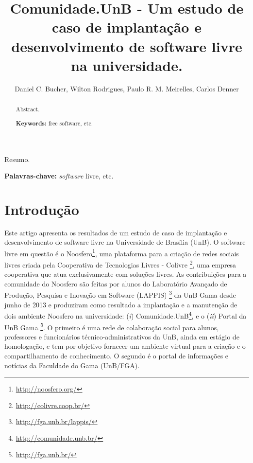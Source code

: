 \documentclass[12pt]{article}
\begin{document}
\sloppy

\title{Comunidade.UnB - Um estudo de caso de implantação e \\
    desenvolvimento de software livre na universidade.}

\author {Daniel C. Bucher, Wilton Rodrigues, Paulo R. M. Meirelles, Carlos Denner}


\address{Departamento de Administração -- Universidade de Brasília (UnB)\\
  Campus Universitário Darcy Ribeiro - ICC Ala Norte, Bloco B -- Brasília -- DF -- Brasil
\nextinstitute
  Faculdade do Gama -- Universidade de Brasília (UnB)\\
  Área Especial, Projeção A -- 72.444-240 -- Gama -- DF -- Brasil
}


\maketitle
\begin{abstract}
  Abstract.

\textbf{Keywords:} free software, etc.

\end{abstract}

\begin{resumo}
  Resumo.

\textbf{Palavras-chave:} \textit{software} livre, etc.
\end{resumo}


\section{Introdução} \label{sec:intro}

Este artigo apresenta os resultados de um estudo de caso de implantação e
desenvolvimento de software livre na Universidade de Brasília (UnB). O
software livre em questão é o Noosfero\footnote{\url{http://noosfero.org/}},
uma plataforma para a criação de redes sociais livres criada pela
Cooperativa de Tecnologias Livres - Colivre%
\footnote{\url{http://colivre.coop.br/}}, uma empresa cooperativa que atua
exclusivamente com soluções livres. As contribuições para a comunidade do
Noosfero são feitas por alunos do Laboratório Avançado de Produção,
Pesquisa e Inovação em Software (LAPPIS)%
\footnote{\url{http://fga.unb.br/lappis/}} da UnB Gama desde junho de 2013
e produziram como resultado a implantação e a manutenção de dois ambiente
Noosfero na universidade: (\textit{i}) Comunidade.UnB\footnote{%
\url{http://comunidade.unb.br/}}, e o (\textit{ii}) Portal da UnB Gama%
\footnote{\url{http://fga.unb.br/}}. O primeiro é uma rede de colaboração
social para alunos, professores e funcionários técnico-administrativos da
UnB, ainda em estágio de homologação, e tem por objetivo fornecer um ambiente
virtual para a criação e o compartilhamento de conhecimento. O segundo é o
portal de informações e notícias da Faculdade do Gama (UnB/FGA).
\end{document}
